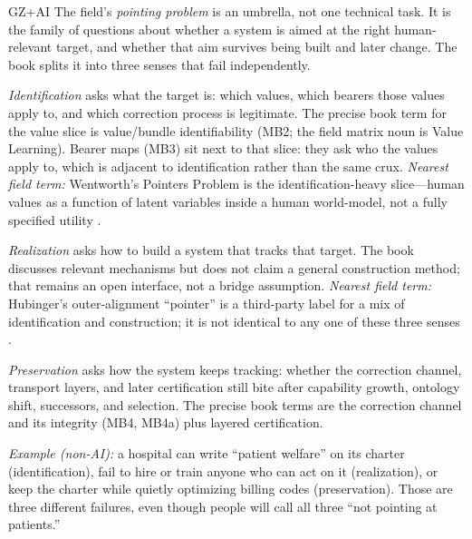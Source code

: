 \begin{authbar}{GZ+AI}
\label{gloss:pointing-problem}\label{sec:pointing-problem}The field's \emph{pointing problem} is an umbrella, not one technical task.
It is the family of questions about whether a system is aimed at the right human-relevant target, and whether that aim survives being built and later change.
The book splits it into three senses that fail independently.

\emph{Identification} asks what the target is: which values, which bearers those values apply to, and which correction process is legitimate.
The precise book term for the value slice is value/bundle identifiability (MB2; the field matrix noun is Value Learning).
Bearer maps (MB3) sit next to that slice: they ask who the values apply to, which is adjacent to identification rather than the same crux.
\emph{Nearest field term:} Wentworth's Pointers Problem is the identification-heavy slice---human values as a function of latent variables inside a human world-model, not a fully specified utility \autocite{wentworth2020pointers}.

\emph{Realization} asks how to build a system that tracks that target.
The book discusses relevant mechanisms but does not claim a general construction method; that remains an open interface, not a bridge assumption.
\emph{Nearest field term:} Hubinger's outer-alignment ``pointer'' is a third-party label for a mix of identification and construction; it is not identical to any one of these three senses \autocite{hubinger2019risks}.

\emph{Preservation} asks how the system keeps tracking: whether the correction channel, transport layers, and later certification still bite after capability growth, ontology shift, successors, and selection.
The precise book terms are the correction channel and its integrity (MB4, MB4a) plus layered certification.

\emph{Example (non-AI):} a hospital can write ``patient welfare'' on its charter (identification), fail to hire or train anyone who can act on it (realization), or keep the charter while quietly optimizing billing codes (preservation).
Those are three different failures, even though people will call all three ``not pointing at patients.''


\end{authbar}
